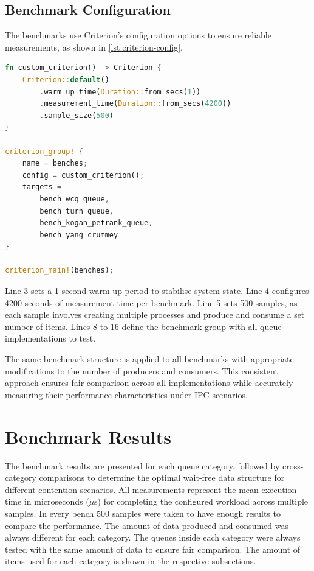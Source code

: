 \subsection{Benchmark Configuration}
The benchmarks use Criterion's configuration options to ensure reliable measurements, as shown in \cref{lst:criterion-config}.

\begin{lstlisting}[language=Rust, style=boxed, caption={Criterion benchmark configuration}, label={lst:criterion-config}]
fn custom_criterion() -> Criterion {
    Criterion::default()
        .warm_up_time(Duration::from_secs(1))
        .measurement_time(Duration::from_secs(4200))
        .sample_size(500)
}

criterion_group! {
    name = benches;
    config = custom_criterion();
    targets =
        bench_wcq_queue,
        bench_turn_queue,
        bench_kogan_petrank_queue,
        bench_yang_crummey
}

criterion_main!(benches);
\end{lstlisting}

Line 3 sets a 1-second warm-up period to stabilise system state. Line 4 configures 4200 seconds of measurement time per benchmark. Line 5 sets 500 samples, as each sample involves creating multiple processes and produce and consume a set number of items. Lines 8 to 16 define the benchmark group with all queue implementations to test.

The same benchmark structure is applied to all benchmarks with appropriate modifications to the number of producers and consumers. This consistent approach ensures fair comparison across all implementations while accurately measuring their performance characteristics under \ac{IPC} scenarios.

\section{Benchmark Results}
The benchmark results are presented for each queue category, followed by cross-category comparisons to determine the optimal wait-free data structure for different contention scenarios. All measurements represent the mean execution time in microseconds ($\mu$s) for completing the configured workload across multiple samples. In every bench 500 samples were taken to have enough results to compare the performance. The amount of data produced and consumed was always different for each category. The queues inside each category were always tested with the same amount of data to ensure fair comparison. The amount of items used for each category is shown in the respective subsections.

